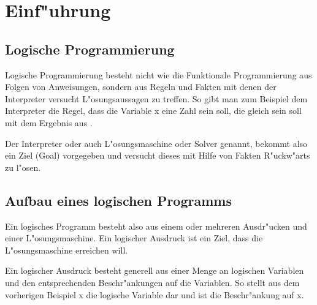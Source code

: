 \section{Einf"uhrung}

\subsection{Logische Programmierung}

Logische Programmierung besteht nicht wie die Funktionale Programmierung aus Folgen von Anweisungen, sondern aus Regeln und Fakten mit denen der Interpreter versucht L"osungsaussagen zu treffen. So gibt man zum Beispiel dem Interpreter die Regel, dass die Variable x eine Zahl sein soll, die gleich sein soll mit dem Ergebnis aus .

Der Interpreter oder auch L"osungsmaschine oder Solver genannt, bekommt also ein Ziel (Goal) vorgegeben und versucht dieses mit Hilfe von Fakten R"uckw"arts zu l"osen.

\subsection{Aufbau eines logischen Programms}

Ein logisches Programm besteht also aus einem oder mehreren Ausdr"ucken und einer L"osungsmaschine. Ein logischer Ausdruck ist ein Ziel, dass die L"osungsmaschine erreichen will.

Ein logischer Ausdruck besteht generell aus einer Menge an logischen Variablen und den entsprechenden Beschr"ankungen auf die Variablen. So stellt aus dem vorherigen Beispiel x die logische Variable dar und  ist die Beschr"ankung auf x.
